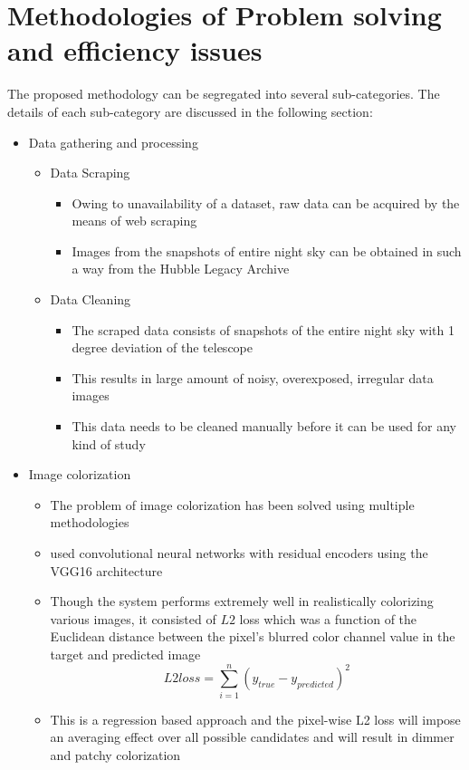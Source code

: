 \documentclass[oneside,a4paper,12pt]{report}
\begin{document}
\section{Methodologies of Problem solving and efficiency issues}
\hspace*{0.25 in}The proposed methodology can be segregated into several sub-categories. The details of each sub-category are discussed in the following section:
\begin{itemize}
	\item Data gathering and processing
	\begin{itemize}
	\item Data Scraping
		\begin{itemize}
		\item Owing to unavailability of a dataset, raw data can be acquired by the means of web scraping
		\item Images from the snapshots of entire night sky can be obtained in such a way from the Hubble Legacy Archive
		\end{itemize}
	\item Data Cleaning
		\begin{itemize}
		\item The scraped data consists of snapshots of the entire night sky with 1 degree deviation of the telescope
		\item This results in large amount of noisy, overexposed, irregular data images
		\item This data needs to be cleaned manually before it can be used for any kind of study
		\end{itemize}
	\end{itemize}
	\item Image colorization
	\begin{itemize}
		\item The problem of image colorization has been solved using multiple methodologies
		\item \cite{dahl2016automatic} used convolutional neural networks with residual encoders using the VGG16 architecture
		\item Though the system performs extremely well in realistically colorizing various images, it consisted of $L2$ loss which was a function of the Euclidean distance between the pixel's blurred color channel value in the target and predicted image
		\begin{equation}
			L2 loss = \sum_{i=1}^n(y_{true} - y_{predicted})^2
		\end{equation}
		\item This is a regression based approach and the pixel-wise L2 loss will impose an averaging effect over all possible candidates and will result in dimmer and patchy colorization

\end{itemize}
\end{itemize}
\end{document}
